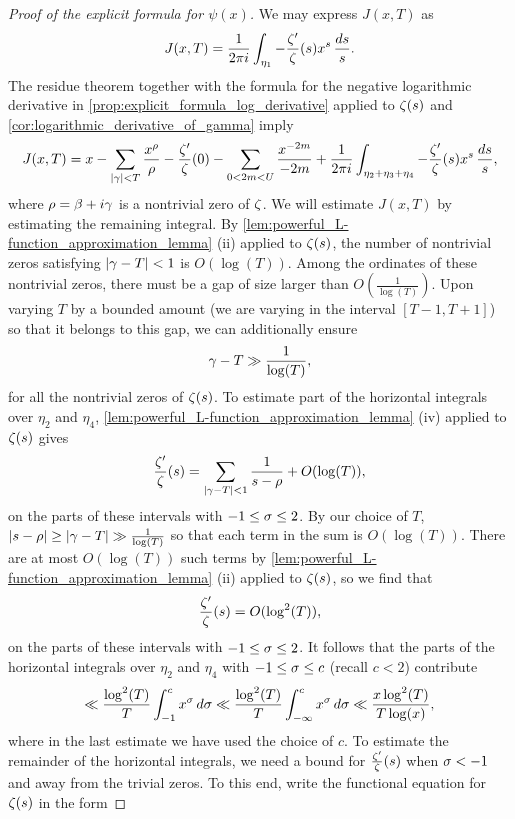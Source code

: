\begin{proof}[Proof of the explicit formula for $\psi(x)$]
      We may express $J(x,T)$ as
      \[
        J(x,T) = \frac{1}{2\pi i}\int_{\eta_{1}}-\frac{\zeta'}{\zeta}(s)x^{s}\,\frac{ds}{s}.
      \]
      The residue theorem together with the formula for the negative logarithmic derivative in \cref{prop:explicit_formula_log_derivative} applied to $\zeta(s)$ and \cref{cor:logarithmic_derivative_of_gamma} imply
      \begin{equation}\label{equ:explicit_formula_zeta_proof_7}
        J(x,T) = x-\sum_{|\gamma| < T}\frac{x^{\rho}}{\rho}-\frac{\zeta'}{\zeta}(0)-\sum_{0 < 2m < U}\frac{x^{-2m}}{-2m}+\frac{1}{2\pi i}\int_{\eta_{2}+\eta_{3}+\eta_{4}}-\frac{\zeta'}{\zeta}(s)x^{s}\,\frac{ds}{s},
      \end{equation}
      where $\rho = \beta+i\gamma$ is a nontrivial zero of $\zeta$. We will estimate $J(x,T)$ by estimating the remaining integral. By \cref{lem:powerful_L-function_approximation_lemma} (ii) applied to $\zeta(s)$, the number of nontrivial zeros satisfying $|\gamma-T| < 1$ is $O(\log(T))$. Among the ordinates of these nontrivial zeros, there must be a gap of size larger than $O\left(\frac{1}{\log(T)}\right)$. Upon varying $T$ by a bounded amount (we are varying in the interval $[T-1,T+1]$) so that it belongs to this gap, we can additionally ensure
      \[
        \gamma-T \gg \frac{1}{\log(T)},
      \]
      for all the nontrivial zeros of $\zeta(s)$. To estimate part of the horizontal integrals over $\eta_{2}$ and $\eta_{4}$, \cref{lem:powerful_L-function_approximation_lemma} (iv) applied to $\zeta(s)$ gives
      \[
        \frac{\zeta'}{\zeta}(s) = \sum_{|\gamma-T| < 1}\frac{1}{s-\rho}+O(\log(T)),
      \]
      on the parts of these intervals with $-1 \le \sigma \le 2$. By our choice of $T$, $|s-\rho| \ge |\gamma-T| \gg \frac{1}{\log(T)}$ so that each term in the sum is $O(\log(T))$. There are at most $O(\log(T))$ such terms by \cref{lem:powerful_L-function_approximation_lemma} (ii) applied to $\zeta(s)$, so we find that
      \[
        \frac{\zeta'}{\zeta}(s) = O(\log^{2}(T)),
      \]
      on the parts of these intervals with $-1 \le \sigma \le 2$. It follows that the parts of the horizontal integrals over $\eta_{2}$ and $\eta_{4}$ with  $-1 \le \sigma \le c$ (recall $c < 2$) contribute
      \begin{equation}\label{equ:explicit_formula_zeta_proof_8}
        \ll \frac{\log^{2}(T)}{T}\int_{-1}^{c}x^{\sigma}\,d\sigma \ll \frac{\log^{2}(T)}{T}\int_{-\infty}^{c}x^{\sigma}\,d\sigma \ll \frac{x\log^{2}(T)}{T\log(x)},
      \end{equation}
      where in the last estimate we have used the choice of $c$. To estimate the remainder of the horizontal integrals, we need a bound for $\frac{\zeta'}{\zeta}(s)$ when $\sigma < -1$ and away from the trivial zeros. To this end, write the functional equation for $\zeta(s)$ in the form

\end{proof}
